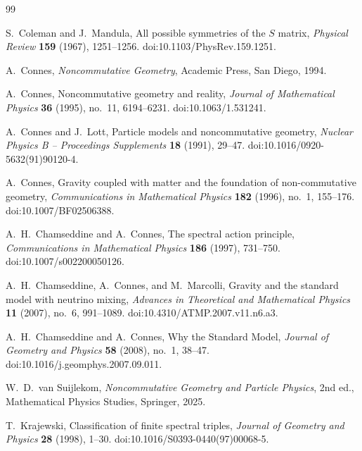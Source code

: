 \documentclass[11pt]{article}
\numberwithin{equation}{section}
\theoremstyle{definition}
\theoremstyle{remark}
\begin{document}
\begin{thebibliography}{99}

S.~Coleman and J.~Mandula,
\newblock All possible symmetries of the $S$ matrix,
\newblock \emph{Physical Review} \textbf{159} (1967), 1251--1256.
\newblock doi:10.1103/PhysRev.159.1251.

A.~Connes,
\newblock \emph{Noncommutative Geometry},
\newblock Academic Press, San Diego, 1994.

A.~Connes,
\newblock Noncommutative geometry and reality,
\newblock \emph{Journal of Mathematical Physics} \textbf{36} (1995), no.~11,
6194--6231.
\newblock doi:10.1063/1.531241.

A.~Connes and J.~Lott,
\newblock Particle models and noncommutative geometry,
\newblock \emph{Nuclear Physics B -- Proceedings Supplements} \textbf{18} (1991),
29--47.
\newblock doi:10.1016/0920-5632(91)90120-4.

A.~Connes,
\newblock Gravity coupled with matter and the foundation of non-commutative
geometry,
\newblock \emph{Communications in Mathematical Physics} \textbf{182} (1996),
no.~1, 155--176.
\newblock doi:10.1007/BF02506388.

A.~H.~Chamseddine and A.~Connes,
\newblock The spectral action principle,
\newblock \emph{Communications in Mathematical Physics} \textbf{186} (1997),
731--750.
\newblock doi:10.1007/s002200050126.

A.~H.~Chamseddine, A.~Connes, and M.~Marcolli,
\newblock Gravity and the standard model with neutrino mixing,
\newblock \emph{Advances in Theoretical and Mathematical Physics}
\textbf{11} (2007), no.~6, 991--1089.
\newblock doi:10.4310/ATMP.2007.v11.n6.a3.

A.~H.~Chamseddine and A.~Connes,
\newblock Why the Standard Model,
\newblock \emph{Journal of Geometry and Physics} \textbf{58} (2008), no.~1,
38--47.
\newblock doi:10.1016/j.geomphys.2007.09.011.

W.~D.~van Suijlekom,
\newblock \emph{Noncommutative Geometry and Particle Physics},
\newblock 2nd ed., Mathematical Physics Studies, Springer, 2025.

T.~Krajewski,
\newblock Classification of finite spectral triples,
\newblock \emph{Journal of Geometry and Physics} \textbf{28} (1998), 1--30.
\newblock doi:10.1016/S0393-0440(97)00068-5.


\end{thebibliography}
\end{document}
